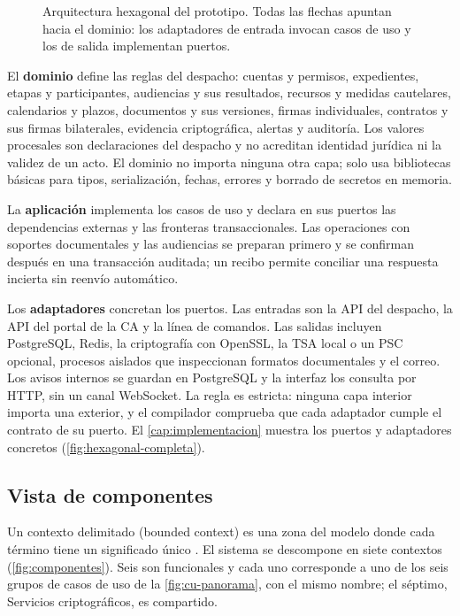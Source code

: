 \begin{figure}[H]
  \centering
  
  \caption{Arquitectura hexagonal del prototipo. Todas las flechas apuntan hacia el dominio: los adaptadores de entrada invocan casos de uso y los de salida implementan puertos.}
  \label{fig:hexagonal}
\end{figure}

El \textbf{dominio} define las reglas del despacho: cuentas y permisos, expedientes, etapas y participantes, audiencias y sus resultados, recursos y medidas cautelares, calendarios y plazos, documentos y sus versiones, firmas individuales, contratos y sus firmas bilaterales, evidencia criptográfica, alertas y auditoría. Los valores procesales son declaraciones del despacho y no acreditan identidad jurídica ni la validez de un acto. El dominio no importa ninguna otra capa; solo usa bibliotecas básicas para tipos, serialización, fechas, errores y borrado de secretos en memoria.

La \textbf{aplicación} implementa los casos de uso y declara en sus puertos las dependencias externas y las fronteras transaccionales. Las operaciones con soportes documentales y las audiencias se preparan primero y se confirman después en una transacción auditada; un recibo permite conciliar una respuesta incierta sin reenvío automático.

Los \textbf{adaptadores} concretan los puertos. Las entradas son la API del despacho, la API del portal de la CA y la línea de comandos. Las salidas incluyen PostgreSQL, Redis, la criptografía con OpenSSL, la TSA local o un PSC opcional, procesos aislados que inspeccionan formatos documentales y el correo. Los avisos internos se guardan en PostgreSQL y la interfaz los consulta por HTTP, sin un canal WebSocket. La regla es estricta: ninguna capa interior importa una exterior, y el compilador comprueba que cada adaptador cumple el contrato de su puerto. El \cref{cap:implementacion} muestra los puertos y adaptadores concretos (\cref{fig:hexagonal-completa}).

\subsection{Vista de componentes}\label{sec:vista-componentes}

Un contexto delimitado (bounded context) es una zona del modelo donde cada término tiene un significado único \cite{evans2003}. El sistema se descompone en siete contextos (\cref{fig:componentes}). Seis son funcionales y cada uno corresponde a uno de los seis grupos de casos de uso de la \cref{fig:cu-panorama}, con el mismo nombre; el séptimo, Servicios criptográficos, es compartido.

